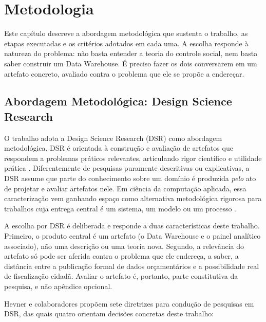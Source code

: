 \chapter{Metodologia}
\label{cap:metodologia}

Este capítulo descreve a abordagem metodológica que sustenta o trabalho,
as etapas executadas e os critérios adotados em cada uma. A escolha
responde à natureza do problema: não basta entender a teoria do controle
social, nem basta saber construir um Data Warehouse. É preciso fazer os
dois conversarem em um artefato concreto, avaliado contra o problema que
ele se propõe a endereçar.

\section{Abordagem Metodológica: Design Science Research}
\label{sec:dsr}

O trabalho adota a Design Science Research (DSR) como abordagem
metodológica. DSR é orientada à construção e avaliação de artefatos que
respondem a problemas práticos relevantes, articulando rigor científico
e utilidade prática \cite{hevner2004}. Diferentemente de pesquisas
puramente descritivas ou explicativas, a DSR assume que parte do
conhecimento sobre um domínio é produzida \emph{pelo} ato de projetar e
avaliar artefatos nele. Em ciência da computação aplicada, essa
caracterização vem ganhando espaço como alternativa metodológica
rigorosa para trabalhos cuja entrega central é um sistema, um modelo ou
um processo \cite{dresch2015}.

A escolha por DSR é deliberada e responde a duas características deste
trabalho. Primeiro, o produto central é um artefato (o Data Warehouse e
o painel analítico associado), não uma descrição ou uma teoria nova.
Segundo, a relevância do artefato só pode ser aferida contra o problema
que ele endereça, a saber, a distância entre a publicação formal de
dados orçamentários e a possibilidade real de fiscalização cidadã.
Avaliar o artefato é, portanto, parte constitutiva da pesquisa, e não
apêndice opcional.

Hevner e colaboradores \cite{hevner2004} propõem sete diretrizes para
condução de pesquisas em DSR, das quais quatro orientam decisões
concretas deste trabalho:

